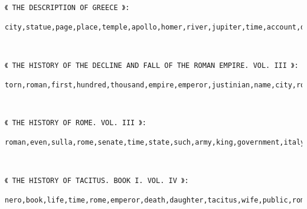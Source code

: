 \documentclass[11pt]{article}
\begin{document}
    \begin{Verbatim}[commandchars=\\\{\}]
《 THE DESCRIPTION OF GREECE 》:
 city,statue,page,place,temple,apollo,homer,river,jupiter,time,account,daughter,part,olympic,therefore,fame,hence,greece,picture,statuary

    \end{Verbatim}

    \begin{center}
    \end{center}
    { \hspace*{\fill} \\}
    
    \begin{Verbatim}[commandchars=\\\{\}]
《 THE HISTORY OF THE DECLINE AND FALL OF THE ROMAN EMPIRE. VOL. III 》:
 torn,roman,first,hundred,thousand,empire,emperor,justinian,name,city,rome,death,hist,constantinople,mahomet,reign,life,fall,general,italy

    \end{Verbatim}

    \begin{center}
    \end{center}
    { \hspace*{\fill} \\}
    
    \begin{Verbatim}[commandchars=\\\{\}]
《 THE HISTORY OF ROME. VOL. III 》:
 roman,even,sulla,rome,senate,time,state,such,army,king,government,italy,very,gracchus,book,general,chap,before,italian,gaius

    \end{Verbatim}

    \begin{center}
    \end{center}
    { \hspace*{\fill} \\}
    
    \begin{Verbatim}[commandchars=\\\{\}]
《 THE HISTORY OF TACITUS. BOOK I. VOL. IV 》:
 nero,book,life,time,rome,emperor,death,daughter,tacitus,wife,public,roman,table,augustus,prince,claudius,section,suet,galba,city

    \end{Verbatim}
\end{document}
